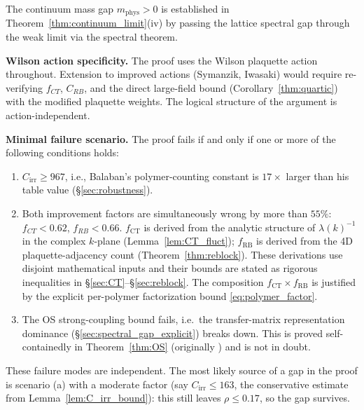 \documentclass[11pt,a4paper]{amsart}
\theoremstyle{definition}
\begin{document}
The continuum mass gap $m_{\mathrm{phys}} > 0$ is established in
Theorem~\ref{thm:continuum_limit}(iv) by passing the lattice spectral
gap through the weak limit via the spectral theorem.

\textbf{Wilson action specificity.}
The proof uses the Wilson plaquette action throughout.
Extension to improved actions (Symanzik, Iwasaki) would require
re-verifying $f_{CT}$, $C_{RB}$, and the direct large-field bound
(Corollary~\ref{thm:quartic}) with the modified plaquette weights.
The logical structure of the argument is action-independent.

\textbf{Minimal failure scenario.}
The proof fails if and only if one or more of the following conditions holds:
\begin{enumerate}[label=(\alph*)]
  \item $C_{\mathrm{irr}} \ge 967$, i.e., Balaban's polymer-counting constant
        is $17\times$ larger than his table value (§\ref{sec:robustness}).
  \item Both improvement factors are simultaneously wrong by more than
        $55\%$: $f_{CT} < 0.62$, $f_{RB} < 0.66$.
        $f_{\mathrm{CT}}$ is derived from the analytic structure of $\lambda(k)^{-1}$
        in the complex $k$-plane (Lemma~\ref{lem:CT_fluct});
        $f_{\mathrm{RB}}$ is derived from the 4D plaquette-adjacency count
        (Theorem~\ref{thm:reblock}).
        These derivations use disjoint mathematical inputs and their bounds
        are stated as rigorous inequalities in §\ref{sec:CT}--§\ref{sec:reblock}.
        The composition $f_{\mathrm{CT}} \times f_{\mathrm{RB}}$ is justified by
        the explicit per-polymer factorization bound \eqref{eq:polymer_factor}.
  \item The OS strong-coupling bound fails, i.e.\ the transfer-matrix
        representation dominance (§\ref{sec:spectral_gap_explicit}) breaks down.
        This is proved self-containedly in Theorem~\ref{thm:OS} (originally \cite{OS78})
        and is not in doubt.
\end{enumerate}
These failure modes are independent.
The most likely source of a gap in the proof is scenario (a) with a moderate
factor (say $C_{\mathrm{irr}} \le 163$, the conservative estimate from
Lemma~\ref{lem:C_irr_bound}): this still leaves
$\rho \le 0.17$, so the gap survives.
\end{document}
